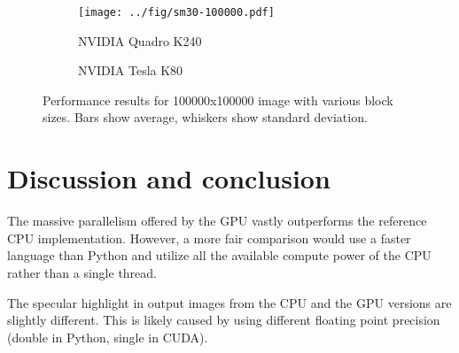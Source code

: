 \documentclass{article}
\begin{document}
\begin{figure}
    \begin{subfigure}{\linewidth}
        \texttt{[image: ../fig/sm30-100000.pdf]}
        \caption{NVIDIA Quadro K240}
    \end{subfigure}
    \begin{subfigure}{\linewidth}
        \caption{NVIDIA Tesla K80}
    \end{subfigure}
    \caption{Performance results for 100000x100000 image with various block
        sizes. Bars show average, whiskers show
    standard deviation.}
\end{figure}

\section{Discussion and conclusion}

The massive parallelism offered by the GPU vastly outperforms the reference CPU
implementation. However, a more fair comparison would use a faster language than
Python and utilize all the available compute power of the CPU rather than a
single thread.

The specular highlight in output images from the CPU and the GPU versions are
slightly different. This is likely caused by using different floating
point precision (double in Python, single in CUDA).
\end{document}

